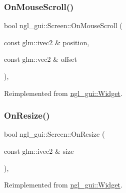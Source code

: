 \mbox{\label{classngl__gui_1_1_screen_a9aca448e61f50b24bfa2a5782424b910}} 
\subsubsection{\texorpdfstring{On\+Mouse\+Scroll()}{OnMouseScroll()}}
{\footnotesize\ttfamily bool ngl\+\_\+gui\+::\+Screen\+::\+On\+Mouse\+Scroll (\begin{DoxyParamCaption}\item[{const glm\+::ivec2 \&}]{position,  }\item[{const glm\+::vec2 \&}]{offset }\end{DoxyParamCaption})\hspace{0.3cm}{\ttfamily [override]}, {\ttfamily [virtual]}}



Reimplemented from \mbox{\hyperlink{classngl__gui_1_1_widget_a754155677479020794938b90229aba58}{ngl\+\_\+gui\+::\+Widget}}.

\mbox{\label{classngl__gui_1_1_screen_aa217aa70046107e5626e865c3bd4b385}} 
\subsubsection{\texorpdfstring{On\+Resize()}{OnResize()}}
{\footnotesize\ttfamily bool ngl\+\_\+gui\+::\+Screen\+::\+On\+Resize (\begin{DoxyParamCaption}\item[{const glm\+::ivec2 \&}]{size }\end{DoxyParamCaption})\hspace{0.3cm}{\ttfamily [override]}, {\ttfamily [virtual]}}



Reimplemented from \mbox{\hyperlink{classngl__gui_1_1_widget_ab360115cc08879ea3f9b301bdccc05ce}{ngl\+\_\+gui\+::\+Widget}}.

\mbox{\label{classngl__gui_1_1_screen_ab80fea511f7af195b1f5352c9a04a86e}} 
